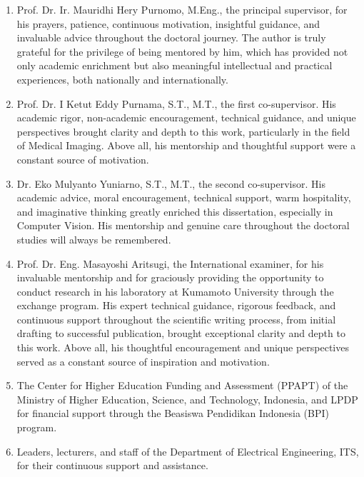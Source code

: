 \begin{enumerate}
	\setlength{\itemsep}{1pt}
	\setlength{\parskip}{0pt}
	\setlength{\parsep}{0pt}
	
	\item Prof. Dr. Ir. Mauridhi Hery Purnomo, M.Eng., the principal supervisor, for his prayers, patience, continuous motivation, insightful guidance, and invaluable advice throughout the doctoral journey. The author is truly grateful for the privilege of being mentored by him, which has provided not only academic enrichment but also meaningful intellectual and practical experiences, both nationally and internationally.

	\item Prof. Dr. I Ketut Eddy Purnama, S.T., M.T., the first co-supervisor. His academic rigor, non-academic encouragement, technical guidance, and unique perspectives brought clarity and depth to this work, particularly in the field of Medical Imaging. Above all, his mentorship and thoughtful support were a constant source of motivation. 

	\item Dr. Eko Mulyanto Yuniarno, S.T., M.T., the second co-supervisor. His academic advice, moral encouragement, technical support, warm hospitality, and imaginative thinking greatly enriched this dissertation, especially in Computer Vision. His mentorship and genuine care throughout the doctoral studies will always be remembered. 

	\item Prof. Dr. Eng. Masayoshi Aritsugi, the International examiner, for his invaluable mentorship and for graciously providing the opportunity to conduct research in his laboratory at Kumamoto University through the exchange program. His expert technical guidance, rigorous feedback, and continuous support throughout the scientific writing process, from initial drafting to successful publication, brought exceptional clarity and depth to this work. Above all, his thoughtful encouragement and unique perspectives served as a constant source of inspiration and motivation.
	
	\item The Center for Higher Education Funding and Assessment (PPAPT) of the Ministry of Higher Education, Science, and Technology, Indonesia, and LPDP for financial support through the Beasiswa Pendidikan Indonesia (BPI) program.
	
	\item Leaders, lecturers, and staff of the Department of Electrical Engineering, ITS, for their continuous support and assistance.
	

\end{enumerate}
